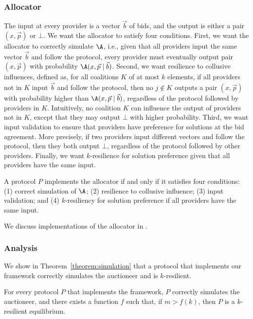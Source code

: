\subsubsection{Allocator} The input at every provider is a vector $\vec{b}$ of bids,
and the output is either a pair $(x,\vec{p})$ or $\bot$.
We want the allocator to satisfy four conditions. First, we want the allocator
to correctly simulate $\A$, i.e., given that
all providers input the same vector $\vec{b}$ and follow the protocol,
every provider must eventually output pair $(x,\vec{p})$
with probability $\A(x,\vec{p} \mid \vec{b})$.
Second, we want resilience to collusive influences,
defined as, for all coalitions $K$ of at most $k$ elements,
if all providers not in $K$ input $\vec{b}$
and follow the protocol, then no $j \notin K$ outputs a pair $(x,\vec{p})$
with probability higher than $\A(x,\vec{p} \mid \vec{b})$,
regardless of the protocol followed by providers in $K$.
Intuitively, no coalition $K$ can influence the output of providers not in $K$,
except that they may output $\bot$ with higher probability.
Third, we want input validation to ensure that
providers have preference for solutions at the bid agreement.
More precisely, if two providers input different vectors
and follow the protocol, then they both output $\bot$,
regardless of the protocol followed by other providers.
Finally, we want $k$-resilience for solution preference
given that all providers have the same input.

\begin{property}
\label{prop:allocator}
A protocol $P$ implements the allocator if and only if it satisfies four conditions:
(1) correct simulation of $\A$; (2) resilience to collusive influence;
(3) input validation; and (4) $k$-resiliency for solution preference
if all providers have the same input.
\end{property}

We discuss implementations of the allocator in .

\subsubsection{Analysis}
We show in Theorem~\ref{theorem:simulation}
that a protocol that implements our framework correctly
simulates the auctioneer and is $k$-resilient.

\begin{theorem}
\label{theorem:simulation}
For every protocol $P$ that implements the framework,
$P$ correctly simulates the auctioneer,
and there exists a function $f$ such that, if $m > f(k)$,
then $P$ is a $k$-resilient equilibrium.
\end{theorem}

